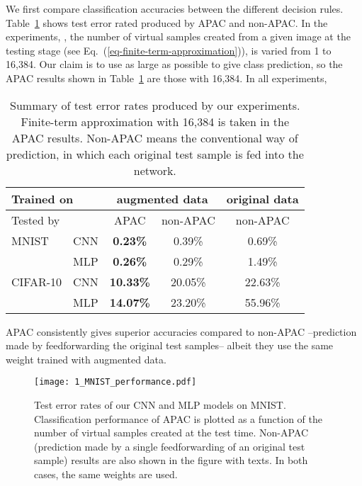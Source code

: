 \documentclass[10pt,twocolumn,letterpaper]{article}
\begin{document}
We first compare classification accuracies between the different decision rules.
Table~\ref{table-summary} shows test error rated produced by APAC and non-APAC.
In the experiments, , the number of virtual samples created from a given image at the testing stage
(see Eq.~(\ref{eq-finite-term-approximation})), is varied from 1 to 16,384.
Our claim is to use as large  as possible to give class prediction,
so the APAC results shown in Table~\ref{table-summary} are those with 16,384.
In all experiments, 
\begin{table}[h]
\caption{Summary of test error rates produced by our experiments. 
Finite-term approximation with 16,384 is taken in the APAC results.
Non-APAC means the conventional way of prediction, in which each original test sample is fed into the network.}
\begin{center}
{\small
\begin{tabular}{|l|c|c|c|c|}
\hline
\multicolumn{2}{|l|}{Trained on} & \multicolumn{2}{|c|}{augmented data} & original data\\
\hline
\multicolumn{2}{|l|}{Tested by}  & APAC & non-APAC & non-APAC\\
\hline\hline
MNIST    & CNN &  {\bf 0.23\%}  & 0.39\%      & 0.69\% \\
& MLP &  {\bf 0.26\%}  & 0.29\%      & 1.49\% \\
\hline
CIFAR-10 & CNN &  {\bf 10.33\%}  & 20.05\%    & 22.63\% \\
& MLP &  {\bf 14.07\%}  & 23.20\%    & 55.96\% \\
\hline
\end{tabular}
}
\end{center}
\label{table-summary}
\end{table}
APAC consistently gives superior accuracies compared to non-APAC
--prediction made by feedforwarding the original test samples-- 
albeit they use the same weight trained with augmented data.

\begin{figure}[t]
\begin{center}
\texttt{[image: 1\_MNIST\_performance.pdf]}
\end{center}
\caption{Test error rates of our CNN and MLP models on MNIST.
Classification performance of APAC is plotted as a function of the number of virtual samples created at the test time.
Non-APAC (prediction made by a single feedforwarding of an original test sample) results are also shown 
in the figure with texts.
In both cases, the same weights are used.}
\label{fig-test-error-rate-mnist}
\end{figure}
\end{document}
